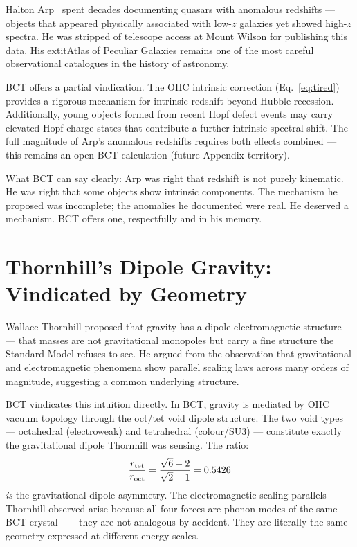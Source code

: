\documentclass[twocolumn,10pt]{article}
\begin{document}
Halton Arp~\cite{arp} spent decades documenting quasars with
anomalous redshifts --- objects that appeared physically associated
with low-$z$ galaxies yet showed high-$z$ spectra. He was stripped
of telescope access at Mount Wilson for publishing this data.
His 	extit{Atlas of Peculiar Galaxies} remains one of the most
careful observational catalogues in the history of astronomy.

BCT offers a partial vindication. The OHC intrinsic correction
(Eq.~\ref{eq:tired}) provides a rigorous mechanism for intrinsic
redshift beyond Hubble recession. Additionally, young objects
formed from recent Hopf defect events may carry elevated Hopf
charge states that contribute a further intrinsic spectral shift.
The full magnitude of Arp's anomalous redshifts requires both
effects combined --- this remains an open BCT calculation
(future Appendix territory).

What BCT can say clearly: Arp was right that redshift is not
purely kinematic. He was right that some objects show intrinsic
components. The mechanism he proposed was incomplete; the
anomalies he documented were real. He deserved a mechanism.
BCT offers one, respectfully and in his memory.

\section{Thornhill's Dipole Gravity: Vindicated by Geometry}

Wallace Thornhill proposed that gravity has a dipole electromagnetic
structure --- that masses are not gravitational monopoles but carry
a fine structure the Standard Model refuses to see. He argued from
the observation that gravitational and electromagnetic phenomena show
parallel scaling laws across many orders of magnitude, suggesting
a common underlying structure.

BCT vindicates this intuition directly. In BCT, gravity is mediated
by OHC vacuum topology through the oct/tet void dipole structure.
The two void types --- octahedral (electroweak) and tetrahedral
(colour/SU3) --- constitute exactly the gravitational dipole
Thornhill was sensing. The ratio:
%
\begin{equation}
\frac{r_{\rm tet}}{r_{\rm oct}} = \frac{\sqrt{6}-2}{\sqrt{2}-1} = 0.5426
\end{equation}
%
\textit{is} the gravitational dipole asymmetry. The electromagnetic
scaling parallels Thornhill observed arise because all four forces
are phonon modes of the same BCT crystal~\cite{bct_l57} --- they
are not analogous by accident. They are literally the same geometry
expressed at different energy scales.
\end{document}
